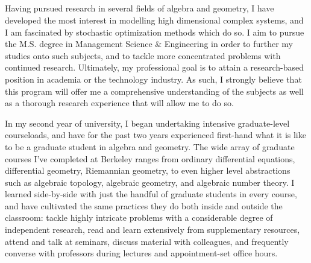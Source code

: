 \documentclass[11pt]{article}
\title{\vspace{-6.5ex}\sc{\large Statement of Purpose}\\[-6.0ex]}
\date{}
\begin{document}
\maketitle
\thispagestyle{empty}




Having pursued research in several fields of algebra and geometry, I have developed the most interest in modelling high dimensional complex systems, and I am fascinated by stochastic optimization methods which do so. I aim to pursue the M.S. degree in Management Science \& Engineering in order to further my studies onto such subjects, and to tackle more concentrated problems with continued research. Ultimately, my professional goal is to attain a research-based position in academia or the technology industry. As such, I strongly believe that this program will offer me a comprehensive understanding of the subjects as well as a thorough research experience that will allow me to do so.

In my second year of university, I began undertaking intensive graduate-level courseloads, and have for the past two years experienced first-hand what it is like to be a graduate student in algebra and geometry. The wide array of graduate courses I've completed at Berkeley ranges from ordinary differential equations, differential geometry, Riemannian geometry, to even higher level abstractions such as algebraic topology, algebraic geometry, and algebraic number theory. I learned side-by-side with just the handful of graduate students in every course, and have cultivated the same practices they do both inside and outside the classroom: tackle highly intricate problems with a considerable degree of independent research, read and learn extensively from supplementary resources, attend and talk at seminars, discuss material with colleagues, and frequently converse with professors during lectures and appointment-set office hours.
\end{document}
